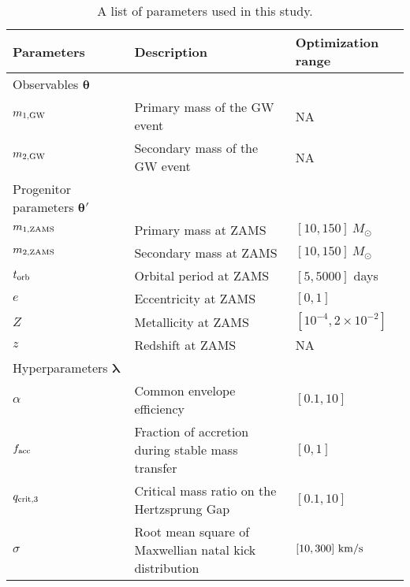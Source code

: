 \documentclass[twocolumn]{aastex631}
\begin{document}
\begin{table*}[hbt!]
    \begin{center}
    \begin{tabular}{ l l l }
    \hline
    \hline
    Parameters &  Description & Optimization range\\
    \hline
    \hline
    Observables $\bm{\theta}$ &\ &\  \\
    \hline
    \hline
    $m_{\rm 1, GW}$ & Primary mass of the GW event & NA \\
    $m_{\rm 2, GW}$ & Secondary mass of the GW event  & NA\\
    \hline
    \hline
    Progenitor parameters $\bm{\theta'}$&\ &\  \\
    \hline
    \hline
    $m_{\rm 1, ZAMS}$ & Primary mass at ZAMS & $[10,150]\ M_{\odot}$\\
    $m_{\rm 2, ZAMS}$ & Secondary mass at ZAMS & $[10,150]\ M_{\odot}$\\
    $t_{\rm orb}$ & Orbital period at ZAMS & $[5,5000]$ days\\
    $e$ & Eccentricity at ZAMS & $[0,1]$\\
    $Z$ & Metallicity at ZAMS & $[10^{-4},2\times10^{-2}]$\\
    $z$ & Redshift at ZAMS & NA\\
    \hline
    \hline
    Hyperparameters $\bm{\lambda    }$ &\ &\ \\
    \hline
    \hline

    $\alpha$ & Common envelope efficiency & $[0.1,10]$\\
    $f_{\rm acc}$ & Fraction of accretion during stable mass transfer &
    $[0,1]$\\
    $q_{\rm crit,3}$ & Critical mass ratio on the Hertzsprung Gap & $[0.1,10]$\\
    $\sigma$ & Root mean square of Maxwellian natal kick distribution&
    $[10,300]\ {\rm km/s}$\\


    \hline
    \hline
    \end{tabular}
    \caption{A list of parameters used in this study.}
    \label{tab:parameters}
    \end{center}
\end{table*}
\end{document}
